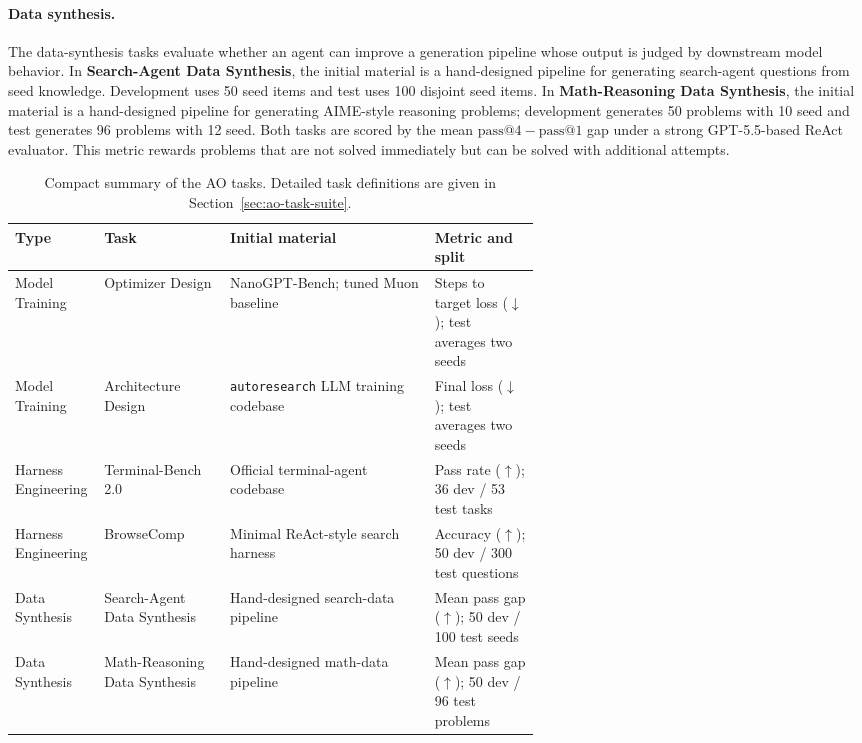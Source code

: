 \documentclass{llmxive}
\providecommand{\arraystretch}{1.08}
\begin{document}
\paragraph{Data synthesis.}
The data-synthesis tasks evaluate whether an agent can improve a generation
pipeline whose output is judged by downstream model behavior. In
\textbf{Search-Agent Data Synthesis}, the initial material is a hand-designed
pipeline for generating search-agent questions from seed knowledge. Development
uses 50 seed items and test uses 100 disjoint seed items. In
\textbf{Math-Reasoning Data Synthesis}, the initial material is a hand-designed
pipeline for generating AIME-style reasoning problems; development generates 50
problems with 10 seed and test generates 96 problems with 12 seed. Both tasks are scored by the mean
$\mathrm{pass@4}-\mathrm{pass@1}$ gap under a strong GPT-5.5-based ReAct
evaluator. This metric rewards problems that are not solved immediately but can
be solved with additional attempts.

\begin{table}[t]
\centering
\small
\setlength{\tabcolsep}{3.0pt}
\renewcommand{\arraystretch}{1.08}
\begin{tabularx}{\linewidth}{>{\arraybackslash}p{0.17\linewidth}>{\arraybackslash}p{0.24\linewidth}>{\arraybackslash}X>{\arraybackslash}p{0.20\linewidth}}
\toprule
Type & Task & Initial material & Metric and split \\
\midrule
Model Training & Optimizer Design & NanoGPT-Bench; tuned Muon baseline & Steps to
target loss ($\downarrow$); test averages two seeds \\
Model Training & Architecture Design & \texttt{autoresearch} LLM training
codebase & Final loss ($\downarrow$); test averages two seeds \\
Harness Engineering & Terminal-Bench 2.0 & Official terminal-agent codebase &
Pass rate ($\uparrow$); 36 dev / 53 test tasks \\
Harness Engineering & BrowseComp & Minimal ReAct-style search harness &
Accuracy ($\uparrow$); 50 dev / 300 test questions \\
Data Synthesis & Search-Agent Data Synthesis & Hand-designed search-data
pipeline & Mean pass gap ($\uparrow$); 50 dev / 100 test seeds \\
Data Synthesis & Math-Reasoning Data Synthesis & Hand-designed math-data
pipeline & Mean pass gap ($\uparrow$); 50 dev / 96 test problems \\
\bottomrule
\end{tabularx}
\caption{Compact summary of the AO tasks. Detailed task definitions are given in
Section~\ref{sec:ao-task-suite}.}
\label{tab:ao-tasks}
\end{table}
\end{document}
